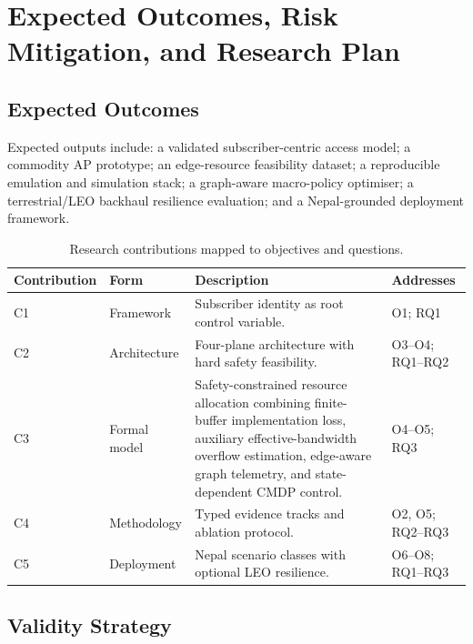 \chapter{Expected Outcomes, Risk Mitigation, and Research Plan}
\label{ch:outcomes}

\section{Expected Outcomes}
\label{sec:outcomes}

Expected outputs include: a validated subscriber-centric access model; a commodity AP prototype; an edge-resource feasibility dataset; a reproducible emulation and simulation stack; a graph-aware macro-policy optimiser; a terrestrial/LEO backhaul resilience evaluation; and a Nepal-grounded deployment framework.

\begin{table}[H]
\centering
\caption{Research contributions mapped to objectives and questions.}
\label{tab:contributions}
\begin{tabularx}{\textwidth}{llXl}
\toprule
\textbf{Contribution} & \textbf{Form} & \textbf{Description} & \textbf{Addresses} \\
\midrule
C1 & Framework & Subscriber identity as root control variable. & O1; RQ1 \\
C2 & Architecture & Four-plane architecture with hard safety feasibility. & O3--O4; RQ1--RQ2 \\
C3 & Formal model & Safety-constrained resource allocation combining finite-buffer implementation loss, auxiliary effective-bandwidth overflow estimation, edge-aware graph telemetry, and state-dependent CMDP control. & O4--O5; RQ3 \\
C4 & Methodology & Typed evidence tracks and ablation protocol. & O2, O5; RQ2--RQ3 \\
C5 & Deployment & Nepal scenario classes with optional LEO resilience. & O6--O8; RQ1--RQ3 \\
\bottomrule
\end{tabularx}
\end{table}

\section{Validity Strategy}
\label{sec:validity}

